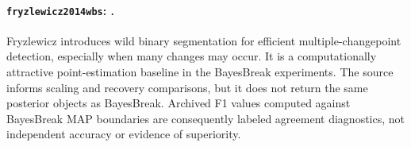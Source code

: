 
\paragraph{\texttt{fryzlewicz2014wbs}: \citet{fryzlewicz2014wbs}.}
Fryzlewicz introduces wild binary segmentation for efficient multiple-changepoint detection, especially when many changes may occur. It is a computationally attractive point-estimation baseline in the BayesBreak experiments. The source informs scaling and recovery comparisons, but it does not return the same posterior objects as BayesBreak. Archived F1 values computed against BayesBreak MAP boundaries are consequently labeled agreement diagnostics, not independent accuracy or evidence of superiority.
